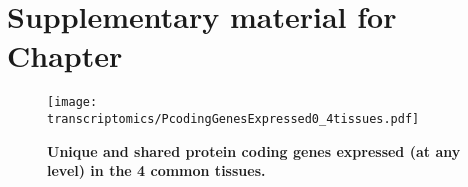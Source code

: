\chapter{Supplementary material for Chapter }

\begin{comment}
\begin{figure}
\centering
\begin{subfigure}[b]{0.60\textwidth}
\centering \includegraphics[width=\textwidth]%
{transcriptomics/UniqueExpression/Castle_1.pdf}
\caption{Castle}\label{fig:UniqueExprCastle}
\end{subfigure}%
~%
\begin{subfigure}[b]{0.60\textwidth}
\centering \includegraphics[width=\textwidth]%
{transcriptomics/UniqueExpression/Brawand_1.pdf}
\caption{Brawand}\label{fig:UniqueExprBrawand}
\end{subfigure}

\begin{subfigure}[b]{0.60\textwidth}
\centering \includegraphics[width=\textwidth]%
{transcriptomics/UniqueExpression/IBM_1.pdf}
\caption{IBM}\label{fig:UniqueExprIBM}
\end{subfigure}%
~%
\begin{subfigure}[b]{0.60\textwidth}
\centering \includegraphics[width=\textwidth]%
{transcriptomics/UniqueExpression/Uhlen_1.pdf}
\caption{Uhlen}\label{fig:UniqueExprUhlen}
\end{subfigure}

\begin{subfigure}[b]{0.95\textwidth}
\includegraphics[width=\textwidth]%
{transcriptomics/UniqueExpression/Gtex_1b.pdf}
\caption{Gtex}\label{fig:UniqueExprGtex}
\end{subfigure}
\caption{Protein coding genes expressed per tissues}
\end{figure}
\end{comment}


\begin{figure}[htpb]
\texttt{[image: transcriptomics/PcodingGenesExpressed0\_4tissues.pdf]}\centering
\caption[Unique and shared protein coding genes expressed
in the 4 common tissues]{\label{fig:ExpGenePcoding0_4T}\textbf{Unique and
shared protein coding genes expressed (at any level) in the 4 common tissues.}}
\end{figure}


